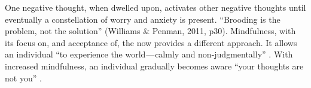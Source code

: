 One negative thought, when dwelled upon, activates other negative thoughts until eventually a constellation of worry and anxiety is present. “Brooding is the problem, not the solution” \citep[][p30]{williams_mindfulness:_2011}(Williams & Penman, 2011, p30). Mindfulness, with its focus on, and acceptance of, the now provides a different approach. It allows an individual “to experience the world — calmly and non-judgmentally” \citep[][p45]{williams_mindfulness:_2011}. With increased mindfulness, an individual gradually becomes aware “your thoughts are not you” \citep[][p64]{williams_mindfulness:_2011}.
  
  